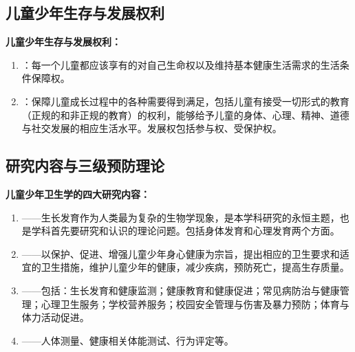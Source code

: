 \subsection{儿童少年生存与发展权利}

\begin{defbox}
\textbf{儿童少年生存与发展权利：}

\begin{enumerate}[leftmargin=*]
    \item {}：每一个儿童都应该享有的对自己生命权以及维持基本健康生活需求的生活条件保障权。
    \item {}：保障儿童成长过程中的各种需要得到满足，包括儿童有接受一切形式的教育（正规的和非正规的教育）的权利，能够给予儿童的身体、心理、精神、道德与社交发展的相应生活水平。发展权包括参与权、受保护权。
\end{enumerate}
\end{defbox}

\subsection{研究内容与三级预防理论}

\begin{defbox}
\textbf{儿童少年卫生学的四大研究内容：}

\begin{enumerate}[leftmargin=*]
    \item {}——生长发育作为人类最为复杂的生物学现象，是本学科研究的永恒主题，也是学科首先要研究和认识的理论问题。包括身体发育和心理发育两个方面。
    \item {}——以保护、促进、增强儿童少年身心健康为宗旨，提出相应的卫生要求和适宜的卫生措施，维护儿童少年的健康，减少疾病，预防死亡，提高生存质量。
    \item {}——包括：生长发育和健康监测；健康教育和健康促进；常见病防治与健康管理；心理卫生服务；学校营养服务；校园安全管理与伤害及暴力预防；体育与体力活动促进。
    \item {}——人体测量、健康相关体能测试、行为评定等。
\end{enumerate}
\end{defbox}

